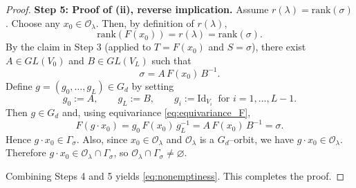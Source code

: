\documentclass{article}
\theoremstyle{definition}
\begin{document}
\begin{proof}
\medskip\noindent
\textbf{Step 5: Proof of (ii), reverse implication.}
Assume $r(\lambda)=\mathrm{rank}(\sigma)$.
Choose any $x_0\in\mathcal O_\lambda$.
Then, by definition of $r(\lambda)$,
\[
\mathrm{rank}(F(x_0))=r(\lambda)=\mathrm{rank}(\sigma).
\]
By the claim in Step 3 (applied to $T=F(x_0)$ and $S=\sigma$), there exist
$A\in GL(V_0)$ and $B\in GL(V_L)$ such that
\[
\sigma=A\,F(x_0)\,B^{-1}.
\]
Define $g=(g_0,\dots,g_L)\in G_d$ by setting
\[
g_0:=A,\qquad g_L:=B,\qquad g_i:=\mathrm{Id}_{V_i}\ \text{ for } i=1,\dots,L-1.
\]
Then $g\in G_d$ and, using equivariance \eqref{eq:equivariance_F},
\[
F(g\cdot x_0)=g_0\,F(x_0)\,g_L^{-1}=A\,F(x_0)\,B^{-1}=\sigma.
\]
Hence $g\cdot x_0\in \Gamma_\sigma$.
Also, since $x_0\in\mathcal O_\lambda$ and $\mathcal O_\lambda$ is a $G_d$--orbit, we have $g\cdot x_0\in\mathcal O_\lambda$.
Therefore $g\cdot x_0\in \mathcal O_\lambda\cap \Gamma_\sigma$, so $\mathcal O_\lambda\cap \Gamma_\sigma\neq\varnothing$.

Combining Steps 4 and 5 yields \eqref{eq:nonemptiness}. This completes the proof.
\end{proof}
\end{document}
